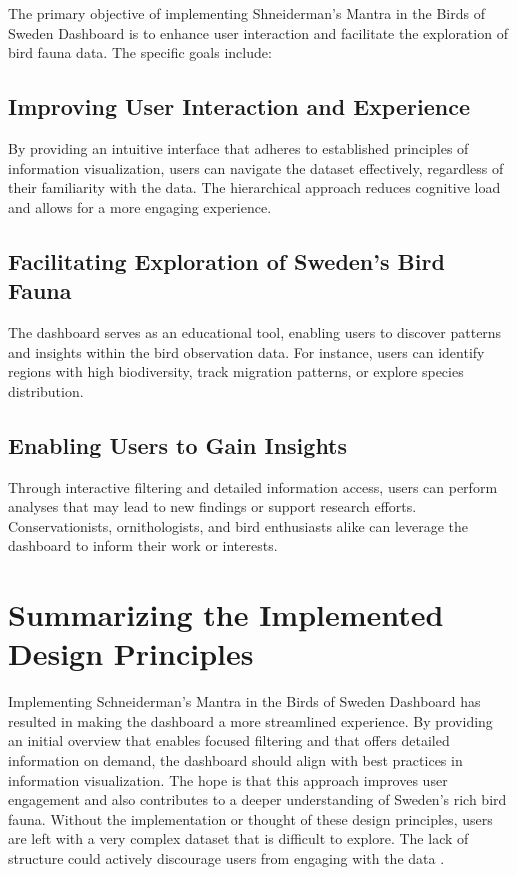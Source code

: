 The primary objective of implementing Shneiderman's Mantra in the Birds of Sweden Dashboard is to enhance user interaction and facilitate the exploration of bird fauna data. The specific goals include:

\subsection{Improving User Interaction and Experience}

By providing an intuitive interface that adheres to established principles of information visualization, users can navigate the dataset effectively, regardless of their familiarity with the data. The hierarchical approach reduces cognitive load and allows for a more engaging experience.

\subsection{Facilitating Exploration of Sweden's Bird Fauna}

The dashboard serves as an educational tool, enabling users to discover patterns and insights within the bird observation data. For instance, users can identify regions with high biodiversity, track migration patterns, or explore species distribution.

\subsection{Enabling Users to Gain Insights}

Through interactive filtering and detailed information access, users can perform analyses that may lead to new findings or support research efforts. Conservationists, ornithologists, and bird enthusiasts alike can leverage the dashboard to inform their work or interests.

\section{Summarizing the Implemented Design Principles}

Implementing Schneiderman's Mantra \cite{fitzgeraldSchneidermansMantra2016} in the Birds of Sweden Dashboard has resulted in making the dashboard a more streamlined experience. By providing an initial overview that enables focused filtering and that offers detailed information on demand, the dashboard should align with best practices in information visualization. The hope is that this approach improves user engagement and also contributes to a deeper understanding of Sweden's rich bird fauna. Without the implementation or thought of these design principles, users are left with a very complex dataset that is difficult to explore. The lack of structure could actively discourage users from engaging with the data \cite{craftGuidelinesWhatCan2005}.